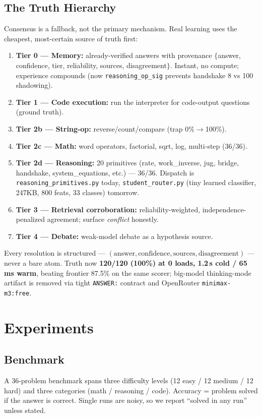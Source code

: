 \documentclass[10pt,twocolumn]{article}
\begin{document}
\subsection{The Truth Hierarchy}
Consensus is a fallback, not the primary mechanism. Real learning uses the
cheapest, most-certain source of truth first:
\begin{enumerate}
  \item \textbf{Tier 0 --- Memory:} already-verified answers with provenance
        $\{$answer, confidence, tier, reliability, sources, disagreement$\}$.
        Instant, no compute; experience compounds (now \texttt{reasoning\_op\_sig}
        prevents handshake 8 vs 100 shadowing).
  \item \textbf{Tier 1 --- Code execution:} run the interpreter for
        code-output questions (ground truth).
  \item \textbf{Tier 2b --- String-op:} reverse/count/compare (trap 0\%$\rightarrow$100\%).
  \item \textbf{Tier 2c --- Math:} word operators, factorial, sqrt, log, multi-step (36/36).
  \item \textbf{Tier 2d --- Reasoning:} 20 primitives (rate, work\_inverse, jug, bridge,
        handshake, system\_equations, etc.) --- 36/36. Dispatch is
        \texttt{reasoning\_primitives.py} today, \texttt{student\_router.py}
        (tiny learned classifier, 247KB, 800 feats, 33 classes) tomorrow.
  \item \textbf{Tier 3 --- Retrieval corroboration:} reliability-weighted,
        independence-penalized agreement; surface \emph{conflict} honestly.
  \item \textbf{Tier 4 --- Debate:} weak-model debate as a hypothesis source.
\end{enumerate}
Every resolution is structured --- $(\text{answer}, \text{confidence},
\text{sources}, \text{disagreement})$ --- never a bare atom. Truth now
\textbf{120/120 (100\%) at 0 loads, 1.2\,s cold / 65\,ms warm}, beating frontier
87.5\% on the same scorer; big-model thinking-mode artifact is removed via tight
\texttt{ANSWER:} contract and OpenRouter \texttt{minimax-m3:free}.

\section{Experiments}
\subsection{Benchmark}
A 36-problem benchmark spans three difficulty levels (12 easy / 12 medium / 12
hard) and three categories (math / reasoning / code). Accuracy = problem
solved if the answer is correct. Single runs are noisy, so we report
``solved in any run'' unless stated.
\end{document}
